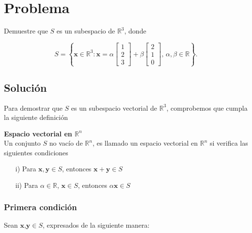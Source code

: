 
\newpage


\section{Problema}

Demuestre que $S$ es un subespacio de $\mathbb{R}^3$, donde

\[
S = \left\{ \mathbf{x} \in \mathbb{R}^3 : \mathbf{x} = \alpha
\begin{bmatrix}
1 \\ 
2 \\ 
3
\end{bmatrix}
+ \beta
\begin{bmatrix}
2 \\ 
1 \\ 
0
\end{bmatrix}, \, \alpha, \beta \in \mathbb{R} \right\}.
\]

\subsection{Solución}
Para demostrar que $S$ es un subespacio vectorial de $\mathbb{R}^3$, comprobemos que cumpla la siguiente definición

\begin{defi}\textbf{Espacio vectorial en $\mathbb{R}^n$}
    \\
    Un conjunto $S$ no vacío de $\mathbb{R}^n$, es llamado un espacio vectorial en $\mathbb{R}^n$ si verifica las siguientes condiciones
    \begin{itemize}
        \item[i)] Para $\mathbf{x},\mathbf{y} \in S$, entonces $\mathbf{x}+\mathbf{y} \in S$ 
        \item[ii)] Para $\alpha \in \mathbb{R}$, $\mathbf{x} \in S$, entonces $\alpha \mathbf{x} \in S$ 
    \end{itemize}
\end{defi}

\subsubsection{Primera condición}
Sean $\mathbf{x}$,$\mathbf{y} \in S$, expresados de la siguiente manera:

